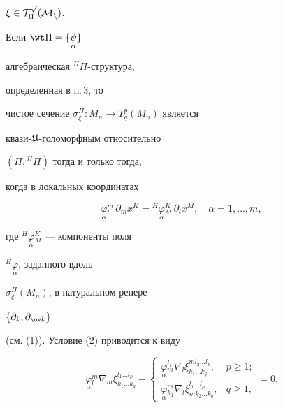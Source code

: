 $\xi \in \cal T^p_q(M_n)$. 


Если $\wt \Pi = \{ \underset{\alpha}{\psi} \}$ ---


алгебраическая ${}^H \Pi$-структура, 


определенная в п.\,3, то 


чистое сечение $\sigma^\Pi_\xi : M_n \to T^p_q(M_n)$ является 


квази-${\frak U}$-голоморфным относительно


$(\Pi, {}^H \Pi)$ тогда и только тогда, 


когда в локальных координатах


\begin{equation}


\underset{\alpha}{\varphi}{}^m_l\, \partial_m x^K = 


{}^H \underset{\alpha}{\varphi}{}^K_M\, \partial_l x^M,


\quad \alpha = 1, \dotsc, m,


\end{equation}


где ${}^H \underset{\alpha}{\varphi}{}^K_M$ --- компоненты поля


${}^H \underset{\alpha}{\varphi}$, заданного вдоль 


$\sigma^\Pi_\xi (M_n)$, в натуральном репере


$\{\partial_k, \partial_{\ov k} \}$ 


(см. (1)). Условие (2) приводится к виду


\begin{equation}


\underset{\alpha}{\varphi}{}^m_l


\nabla_m \xi^{l_1 \dotsc l_p}_{k_1 \dotsc k_q} -


\begin{cases}


\underset{\alpha}{\varphi}{}_m^{l_1}


\nabla_l \xi^{m l_2 \dotsc l_p}_{k_1 \dotsc k_q},& p \ge 1;


\\


\underset{\alpha}{\varphi}{}^m_{k_1}


\nabla_l \xi^{l_1 \dotsc l_p}_{m k_2 \dotsc k_q}, & q \ge 1,


\end{cases}


= 0.


\end{equation}


